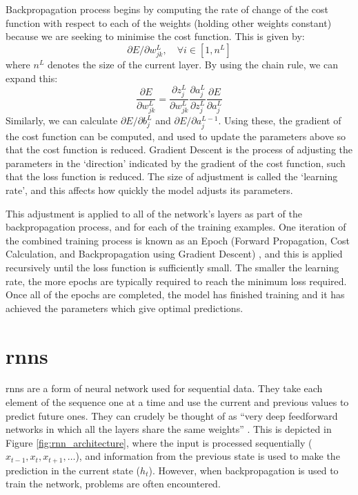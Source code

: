 Backpropagation process begins by computing the rate of change of the cost function with respect to each of the weights (holding other weights constant) because we are seeking to minimise the cost function. This is given by:
$$\partial E/ \partial w_{jk}^L,\quad \forall  i \in [1,n^L]$$ where $n^L$ denotes the size of the current layer. By using the chain rule, we can expand this:
$$\frac{\partial E}{\partial w_{jk}^L} = \frac{\partial z_j^L}{\partial w_{jk}^L} \frac{\partial a_j^L}{\partial z_j^L} \frac{\partial E}{\partial a_j^L}$$ %
Similarly, we can calculate $\partial E/ \partial b_j^L$ and $\partial E/ \partial a_j^{L-1}$. Using these, the gradient of the cost function can be computed, and used to update the parameters above so that the cost function is reduced. Gradient Descent is the process of adjusting the parameters in the `direction' indicated by the gradient of the cost function, such that the loss function is reduced. The size of adjustment is called the `learning rate', and this affects how quickly the model adjusts its parameters.

This adjustment is applied to all of the network's layers as part of the backpropagation process, and for each of the training examples. One iteration of the combined training process is known as an Epoch (Forward Propagation, Cost Calculation, and Backpropagation using Gradient Descent) \citep{Sharma}, and this is applied recursively until the loss function is sufficiently small. The smaller the learning rate, the more epochs are typically required to reach the minimum loss required. Once all of the epochs are completed, the model has finished training and it has achieved the parameters which give optimal predictions.

\section{\acrlong{rnn}s}
\label{sec:background_rnns}

\acrlong{rnn}s are a form of neural network used for sequential data. They take each element of the sequence one at a time and use the current and previous values to predict future ones. They can crudely be thought of as ``very deep feedforward networks in which all the layers share the same weights'' \citep{Yann}. This is depicted in Figure \ref{fig:rnn_architecture}, where the input is processed sequentially ($x_{t-1}, x_{t}, x_{t+1},\ldots$), and information from the previous state is used to make the prediction in the current state ($h_{t}$). However, when backpropagation is used to train the network, problems are often encountered.

